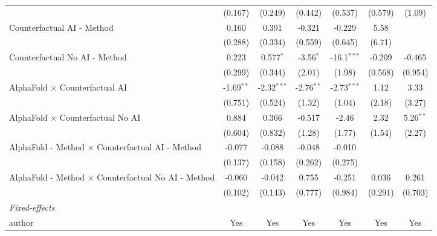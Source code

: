 \begin{tabular}{lcccccc}
                                                              & (0.167)      & (0.249)       & (0.442)      & (0.537)       & (0.579)     & (1.09)\\   
   Counterfactual AI - Method                                 & 0.160        & 0.391         & -0.321       & -0.229        & 5.58        &   \\   
                                                              & (0.288)      & (0.334)       & (0.559)      & (0.645)       & (6.71)      &   \\   
   Counterfactual No AI - Method                              & 0.223        & 0.577$^{*}$   & -3.56$^{*}$  & -16.1$^{***}$ & -0.209      & -0.465\\   
                                                              & (0.299)      & (0.344)       & (2.01)       & (1.98)        & (0.568)     & (0.954)\\   
   AlphaFold $\times$ Counterfactual AI                       & -1.69$^{**}$ & -2.32$^{***}$ & -2.76$^{**}$ & -2.73$^{***}$ & 1.12        & 3.33\\   
                                                              & (0.751)      & (0.524)       & (1.32)       & (1.04)        & (2.18)      & (3.27)\\   
   AlphaFold $\times$ Counterfactual No AI                    & 0.884        & 0.366         & -0.517       & -2.46         & 2.32        & 5.26$^{**}$\\   
                                                              & (0.604)      & (0.832)       & (1.28)       & (1.77)        & (1.54)      & (2.27)\\   
   AlphaFold - Method $\times$ Counterfactual AI - Method     & -0.077       & -0.088        & -0.048       & -0.010        &             &   \\   
                                                              & (0.137)      & (0.158)       & (0.262)      & (0.275)       &             &   \\   
   AlphaFold - Method $\times$ Counterfactual No AI - Method  & -0.060       & -0.042        & 0.755        & -0.251        & 0.036       & 0.261\\   
                                                              & (0.102)      & (0.143)       & (0.777)      & (0.984)       & (0.291)     & (0.703)\\   
   \midrule
   \emph{Fixed-effects}\\
   author                                                     & Yes          & Yes           & Yes          & Yes           & Yes         & Yes\\  

\end{tabular}
